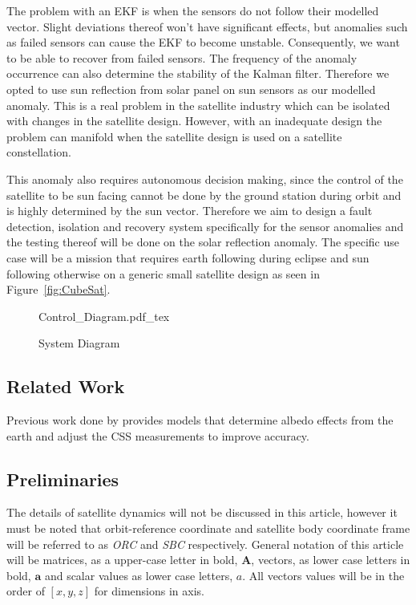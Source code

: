 \documentclass[letterpaper, 10 pt, conference]{ieeeconf}  %
\begin{document}
The problem with an EKF is when the sensors do not follow their modelled vector. Slight deviations thereof won't have significant effects, but anomalies such as failed sensors can cause the EKF to become unstable. Consequently, we want to be able to recover from failed sensors. The frequency of the anomaly occurrence can also determine the stability of the Kalman filter. Therefore we opted to use sun reflection from solar panel on sun sensors as our modelled anomaly. This is a real problem in the satellite industry which can be isolated with changes in the satellite design. However, with an inadequate design the problem can manifold when the satellite design is used on a satellite constellation. 

This anomaly also requires autonomous decision making, since the control of the satellite to be sun facing cannot be done by the ground station during orbit and is highly determined by the sun vector. Therefore we aim to design a fault detection, isolation and recovery system specifically for the sensor anomalies and the testing thereof will be done on the solar reflection anomaly. The specific use case will be a mission that requires earth following during eclipse and sun following otherwise on a generic small satellite design as seen in Figure~\ref{fig:CubeSat}.

\begin{figure*}[!hbt]
	\centering
	\def\svgwidth{12cm}
	{Control_Diagram.pdf_tex}
	\caption{System Diagram}
	\label{fig:System_Diagram}
\end{figure*}

\subsection{Related Work}
Previous work done by \textcite{Cilden-Guler2021} provides models that determine albedo effects from the earth and adjust the CSS measurements to improve accuracy.

\subsection{Preliminaries}
The details of satellite dynamics will not be discussed in this article, however it must be noted that orbit-reference coordinate and satellite body coordinate frame will be referred to as \emph{ORC} and \emph{SBC} respectively. General notation of this article will be matrices, as a upper-case letter in bold, $\mathbf{A}$, vectors, as lower case letters in bold, $\mathbf{a}$ and scalar values as lower case letters, $a$. All vectors values will be in the order of $[x, y, z]$ for dimensions in axis.
\end{document}
